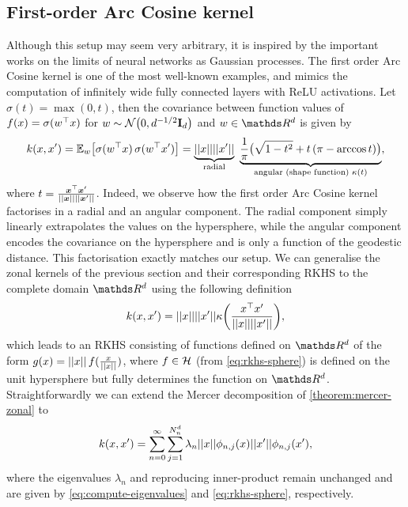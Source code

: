 \subsection{First-order Arc Cosine kernel}
\label{sec:arccosine}
Although this setup may seem very arbitrary, it is inspired by the important works on the limits of neural networks as Gaussian processes. The first order Arc Cosine kernel \citep{cho2009kernel} is one of the most well-known examples, and mimics the computation of infinitely wide fully connected layers with ReLU activations. Let $\sigma(t) = \max(0, t)$, then the covariance between function values of $f(x) = \sigma(w^{\top} x)$ for $w \sim \NormDist{0, d^{-1/2} \Eye_d}$ and $w \in \Reals^d$ is given by
\begin{equation}
\label{eq:arccosine}
    k(x, x') = \Exp{w}{\sigma(w\transpose x)\, \sigma(w\transpose x')} = \underbrace{\norm{x} \norm{x'}}_{\text{radial}}\ \underbrace{\frac{1}{\pi}\big( \sqrt{1 - t^2} + t\, (\pi - \arccos t) \big)}_{\text{angular (shape function) } \kappa(t)},
\end{equation}
where $t = \frac{\bm{x}^\top \bm{x}'}{\lvert\lvert \bm{x}\rvert\rvert\lvert\lvert \bm{x}'\rvert\rvert}$. Indeed, we observe how the first order Arc Cosine kernel factorises in a radial and an angular component. The radial component simply linearly extrapolates the values on the hypersphere, while the angular component encodes the covariance on the hypersphere and is only a function of the geodestic distance. This factorisation exactly matches our setup. We can generalise the zonal kernels of the previous section and their corresponding RKHS to the complete domain $\Reals^d$ using the following definition
\begin{equation}
    k(x, x') = \norm{x} \norm{x'} \kappa\left( \frac{x^\top x'}{\norm{x}\norm{x'}} \right), %
\end{equation}
which leads to an RKHS consisting of functions defined on $\Reals^d$ of the form $g(x) = \lvert\lvert x\rvert\rvert\,f(\frac{x}{\lvert\lvert x\rvert\rvert})$, where $f \in {\mathcal{H}}$ (from \cref{eq:rkhs-sphere}) is defined on the unit hypersphere but fully determines the function on $\Reals^d$. Straightforwardly we can extend the Mercer decomposition of \cref{theorem:mercer-zonal} to
\begin{equation}
    k(x, x') = \sum_{n=0}^{\infty} \sum_{j=1}^{N^d_n} \lambda_{n} \lvert\lvert x\rvert\rvert \phi_{n,j}(x) \lvert\lvert x'\rvert\rvert \phi_{n,j}(x'),
\end{equation}
where the eigenvalues $\lambda_n$ and reproducing inner-product remain unchanged and are given by \cref{eq:compute-eigenvalues} and \cref{eq:rkhs-sphere}, respectively.

